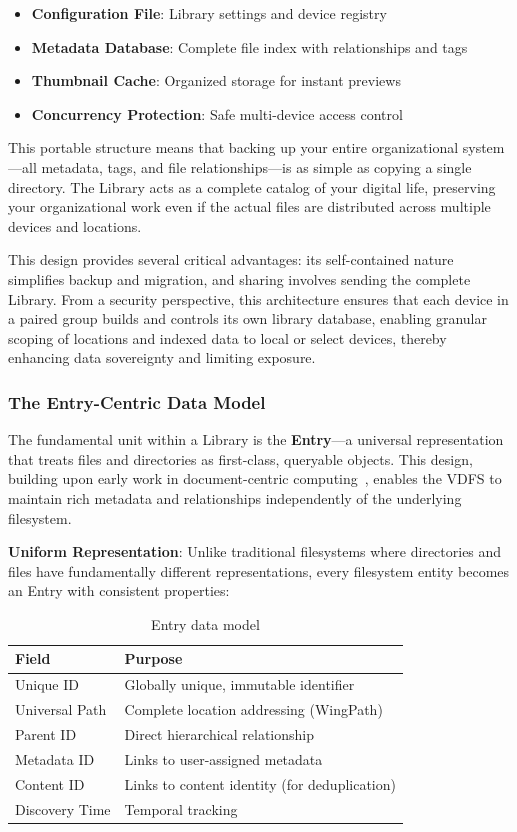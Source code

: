 \documentclass[sigconf]{acmart}
\begin{document}
\begin{itemize}[noitemsep, topsep=0pt]
 \item \textbf{Configuration File}: Library settings and device registry
 \item \textbf{Metadata Database}: Complete file index with relationships and tags
 \item \textbf{Thumbnail Cache}: Organized storage for instant previews
 \item \textbf{Concurrency Protection}: Safe multi-device access control
\end{itemize}

This portable structure means that backing up your entire organizational system—all metadata, tags, and file relationships—is as simple as copying a single directory. The Library acts as a complete catalog of your digital life, preserving your organizational work even if the actual files are distributed across multiple devices and locations.

This design provides several critical advantages: its self-contained nature simplifies backup and migration, and sharing involves sending the complete Library. From a security perspective, this architecture ensures that each device in a paired group builds and controls its own library database, enabling granular scoping of locations and indexed data to local or select devices, thereby enhancing data sovereignty and limiting exposure.

\subsubsection{The Entry-Centric Data Model}
\label{sec:entry-centric}
The fundamental unit within a Library is the \textbf{Entry}---a universal representation that treats files and directories as first-class, queryable objects. This design, building upon early work in document-centric computing~\cite{dourish_presto_1999}, enables the VDFS to maintain rich metadata and relationships independently of the underlying filesystem.

\textbf{Uniform Representation}: Unlike traditional filesystems where directories and files have fundamentally different representations, every filesystem entity becomes an Entry with consistent properties:

\begin{table}[h]
\footnotesize
\centering
\begin{tabular}{@{}ll@{}}
\toprule
\textbf{Field} & \textbf{Purpose} \\
\midrule
Unique ID & Globally unique, immutable identifier \\
Universal Path & Complete location addressing (WingPath) \\
Parent ID & Direct hierarchical relationship \\
Metadata ID & Links to user-assigned metadata \\
Content ID & Links to content identity (for deduplication) \\
Discovery Time & Temporal tracking \\
\bottomrule
\end{tabular}
\caption{Entry data model}
\label{tab:entry-fields}
\end{table}
\end{document}
